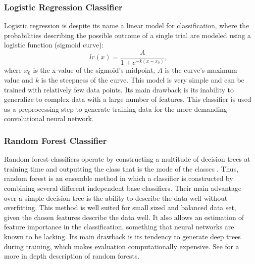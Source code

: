 		\subsubsection{Logistic Regression Classifier}
			Logistic regression is despite its name a linear model for classification, where the probabilities describing the possible outcome of a single trial are modeled using a logistic function (sigmoid curve):
			\begin{equation}
				lr(x) = \dfrac{A}{1 + e^{-k (x-x_0)}},
			\end{equation}
		where $x_0$ is the x-value of the sigmoid's midpoint, $A$ is the curve's maximum value and $k$ is the steepness of the curve. This model is very simple and can be trained with relatively few data points. Its main drawback is its inability to generalize to complex data with a large number of features. This classifier is used as a preprocessing step to generate training data for the more demanding convolutional neural network. 
		
		\subsubsection{Random Forest Classifier}\label{rand_forest_class}
			Random forest classifiers operate by constructing a multitude of decision trees at training time and outputting the class that is the mode of the classes \citep{Ho1995}. Thus, random forest is an ensemble method in which a classifier is constructed by combining several different independent base classifiers. Their main advantage over a simple decision tree is the ability to describe the data well without overfitting. 			
			This method is well suited for small sized and balanced data set, given the chosen features describe the data well. It also allows an estimation of feature importance in the classification, something that neural networks are known to be lacking. Its main drawback is its tendency to generate deep trees during training, which makes evaluation computationally expensive. See \citet{BishopBook} for a more in depth description of random forests. 
			
